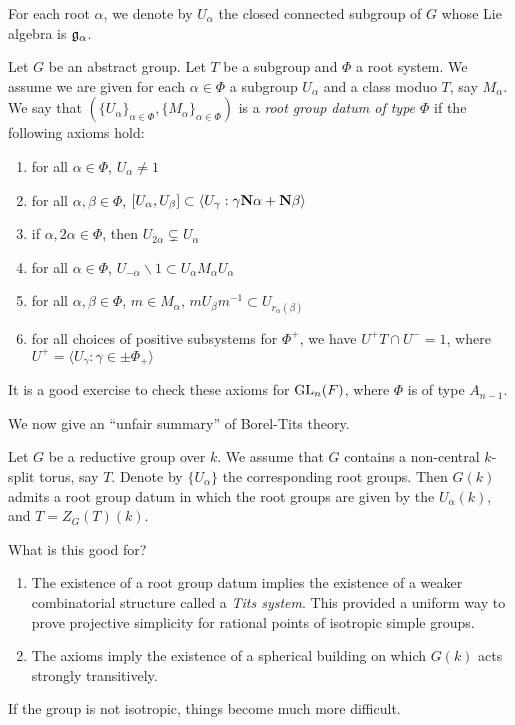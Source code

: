 For each root $\alpha$, we denote by $U_\alpha$ the closed connected subgroup of 
$G$ whose Lie algebra is $\mathfrak{g}_\alpha$. 

\begin{defi}
Let $G$ be an abstract group. Let $T$ be a subgroup and $\Phi$ a root system. We 
assume we are given for each $\alpha\in \Phi$ a subgroup $U_\alpha$ and a class 
moduo $T$, say $M_\alpha$. We say that 
$(\{U_\alpha\}_{\alpha\in \Phi},\{M_\alpha\}_{\alpha\in \Phi})$ is a 
\emph{root group datum of type $\Phi$} if the following axioms hold:
\begin{enumerate}
  \item for all $\alpha\in \Phi$, $U_\alpha\ne 1$
  \item for all $\alpha,\beta\in\Phi$, $[U_\alpha,U_\beta]\subset \langle U_\gamma:\gamma\mathbf{N}\alpha+\mathbf{N}\beta\rangle$
  \item if $\alpha,2\alpha\in \Phi$, then $U_{2\alpha}\subsetneq U_\alpha$
  \item for all $\alpha\in \Phi$, $U_{-\alpha}\smallsetminus 1 \subset U_\alpha M_\alpha U_\alpha$ 
  \item for all $\alpha,\beta\in \Phi$, $m\in M_\alpha$, $m U_\beta m^{-1} \subset U_{r_\alpha(\beta)}$
  \item for all choices of positive subsystems for $\Phi^+$, we have 
    $U^+ T \cap U^-=1$, where $U^+=\langle U_\gamma:\gamma \in \pm \Phi_+\rangle$ 
\end{enumerate}
\end{defi}

It is a good exercise to check these axioms for $\operatorname{GL}_n(F)$, where 
$\Phi$ is of type $A_{n-1}$. 

We now give an ``unfair summary'' of Borel-Tits theory. 

\begin{theo}
Let $G$ be a reductive group over $k$. We assume that $G$ contains a non-central 
$k$-split torus, say $T$. Denote by $\{U_\alpha\}$ the corresponding root groups. 
Then $G(k)$ admits a root group datum in which the root groups are given by the 
$U_\alpha(k)$, and $T=Z_G(T)(k)$. 
\end{theo}

What is this good for? 
\begin{enumerate}
  \item The existence of a root group datum implies the existence of a weaker 
    combinatorial structure called a \emph{Tits system}. This provided a 
    uniform way to prove projective simplicity for rational points of 
    isotropic simple groups. 
  \item The axioms imply the existence of a spherical building on which $G(k)$ 
    acts strongly transitively. 
\end{enumerate}
If the group is not isotropic, things become much more difficult. 


